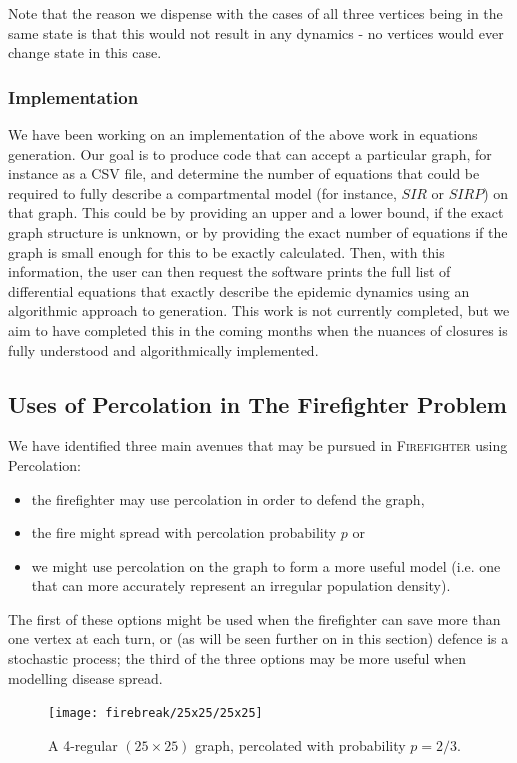 \documentclass[../report.tex]{subfiles}
\begin{document}
Note that the reason we dispense with the cases of all three vertices being in the same state is that this would not result in any dynamics - no vertices would ever change state in this case. 

\subsubsection{Implementation}

We have been working on an implementation of the above work in equations generation. Our goal is to produce code that can accept a particular graph, for instance as a CSV file, and determine the number of equations that could be required to fully describe a compartmental model (for instance, $SIR$ or $SIRP$) on that graph. This could be by providing an upper and a lower bound, if the exact graph structure is unknown, or by providing the exact number of equations if the graph is small enough for this to be exactly calculated. Then, with this information, the user can then request the software prints the full list of differential equations that exactly describe the epidemic dynamics using an algorithmic approach to generation. This work is not currently completed, but we aim to have completed this in the coming months when the nuances of closures is fully understood and algorithmically implemented.

\subsection{Uses of Percolation in The Firefighter Problem}

We have identified three main avenues that may be pursued in {\scshape Firefighter} using Percolation: 
\begin{itemize}
	\item the firefighter may use percolation in order to defend the graph,
	\item the fire might spread with percolation probability $p$ or
	\item we might use percolation on the graph to form a more useful model (i.e. one that can more accurately represent an irregular population density).
\end{itemize}
The first of these options might be used when the firefighter can save more than one vertex at each turn, or (as will be seen further on in this section) defence is a stochastic process; the third of the three options may be more useful when modelling disease spread.
\begin{figure}[ht]
	\centering
		\texttt{[image: firebreak/25x25/25x25]}
	\caption{A 4-regular $(25\times25)$ graph, percolated with probability $p=2/3$.}
	\label{fig:largeperc}
\end{figure}
\end{document}
